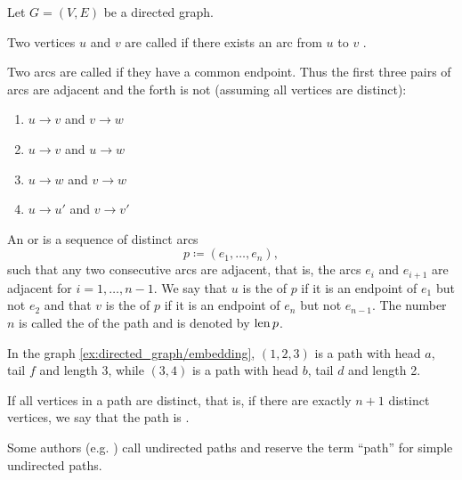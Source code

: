 \begin{definition}\label{def:graph_paths}
  Let \( G = (V, E) \) be a directed graph.

  \begin{defenum}
     Two vertices \( u \)  and \( v \)  are called  if there exists an arc from \( u \)  to \( v \) .

    \cite[chapter 1, section 1.4]{Gondran1984} Two arcs are called  if they have a common endpoint. Thus the first three pairs of arcs are adjacent and the forth is not (assuming all vertices are distinct):
    \begin{enumerate}
      \item \( u \to v \) and \( v \to w \)
      \item \( u \to v \) and \( u \to w \)
      \item \( u \to w \) and \( v \to w \)
      \item \( u \to u' \) and \( v \to v' \)
    \end{enumerate}

    \cite[chapter 1, section 3.1]{Gondran1984} An  or  is a sequence of distinct arcs
    \begin{equation*}
      p \coloneqq ( e_1, \ldots, e_n ),
    \end{equation*}
    such that any two consecutive arcs are adjacent, that is, the arcs \( e_i \) and \( e_{i+1} \) are adjacent for \( i = 1, \ldots, n - 1 \). We say that \( u \) is the  of \( p \) if it is an endpoint of \( e_1 \) but not \( e_2 \) and that \( v \) is the  of \( p \) if it is an endpoint of \( e_n \) but not \( e_{n-1} \). The number $n$ is called the  of the path and is denoted by \( \operatorname{len} p \).

    In the graph \cref{ex:directed_graph/embedding}, \( (1, 2, 3) \) is a path with head \( a \), tail \( f \) and length 3, while \( (3, 4) \) is a path with head \( b \), tail \( d \) and length 2.

    If all vertices in a path are distinct, that is, if there are exactly $n + 1$ distinct vertices, we say that the path is .

    Some authors (e.g. \cite[section 5.2]{Erickson2019}) call undirected paths  and reserve the term \enquote{path} for simple undirected paths.


\end{defenum}
\end{definition}
